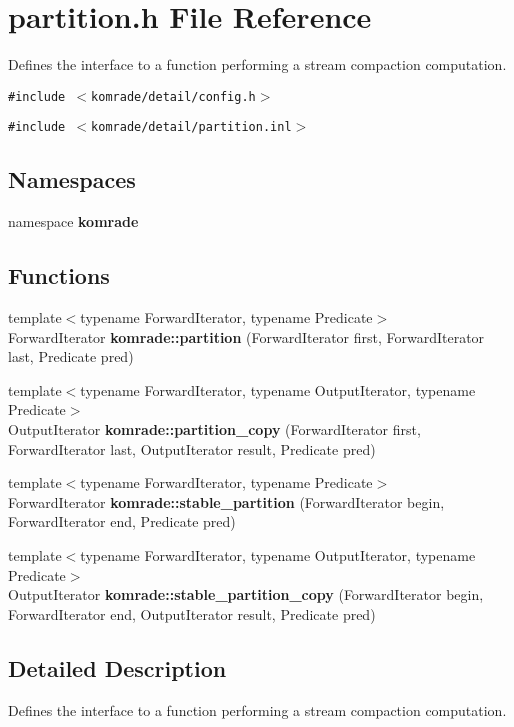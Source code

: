 \section{partition.h File Reference}
\label{partition_8h}
Defines the interface to a function performing a stream compaction computation. 

{\tt \#include $<$komrade/detail/config.h$>$}\par
{\tt \#include $<$komrade/detail/partition.inl$>$}\par
\subsection*{Namespaces}
\begin{CompactItemize}
\item 
namespace {\bf komrade}
\end{CompactItemize}
\subsection*{Functions}
\begin{CompactItemize}
\item 
{\footnotesize template$<$typename ForwardIterator, typename Predicate$>$ }\\ForwardIterator {\bf komrade::partition} (ForwardIterator first, ForwardIterator last, Predicate pred)
\item 
{\footnotesize template$<$typename ForwardIterator, typename OutputIterator, typename Predicate$>$ }\\OutputIterator {\bf komrade::partition\_\-copy} (ForwardIterator first, ForwardIterator last, OutputIterator result, Predicate pred)
\item 
{\footnotesize template$<$typename ForwardIterator, typename Predicate$>$ }\\ForwardIterator {\bf komrade::stable\_\-partition} (ForwardIterator begin, ForwardIterator end, Predicate pred)
\item 
{\footnotesize template$<$typename ForwardIterator, typename OutputIterator, typename Predicate$>$ }\\OutputIterator {\bf komrade::stable\_\-partition\_\-copy} (ForwardIterator begin, ForwardIterator end, OutputIterator result, Predicate pred)
\end{CompactItemize}


\subsection{Detailed Description}
Defines the interface to a function performing a stream compaction computation. 

